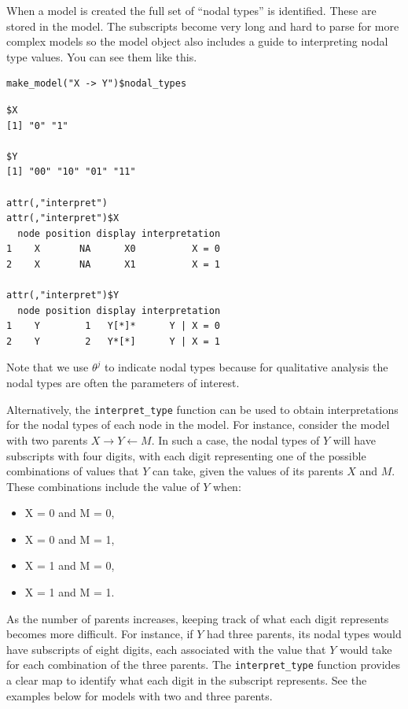 \documentclass[
  article]{jss}
\providecommand{\tightlist}{%
  \setlength{\itemsep}{0pt}\setlength{\parskip}{0pt}}\usepackage{longtable,booktabs,array}
\begin{document}
When a model is created the full set of ``nodal types'' is identified.
These are stored in the model. The subscripts become very long and hard
to parse for more complex models so the model object also includes a
guide to interpreting nodal type values. You can see them like this.

\begin{verbatim}
make_model("X -> Y")$nodal_types
\end{verbatim}

\begin{verbatim}
$X
[1] "0" "1"

$Y
[1] "00" "10" "01" "11"

attr(,"interpret")
attr(,"interpret")$X
  node position display interpretation
1    X       NA      X0          X = 0
2    X       NA      X1          X = 1

attr(,"interpret")$Y
  node position display interpretation
1    Y        1   Y[*]*      Y | X = 0
2    Y        2   Y*[*]      Y | X = 1
\end{verbatim}

Note that we use \(\theta^j\) to indicate nodal types because for
qualitative analysis the nodal types are often the parameters of
interest.

Alternatively, the \texttt{interpret\_type} function can be used to
obtain interpretations for the nodal types of each node in the model.
For instance, consider the model with two parents
\(X \rightarrow Y \leftarrow M.\) In such a case, the nodal types of
\(Y\) will have subscripts with four digits, with each digit
representing one of the possible combinations of values that \(Y\) can
take, given the values of its parents \(X\) and \(M.\) These
combinations include the value of \(Y\) when:

\begin{itemize}
\tightlist
\item
  X = 0 and M = 0,
\item
  X = 0 and M = 1,
\item
  X = 1 and M = 0,
\item
  X = 1 and M = 1.
\end{itemize}

As the number of parents increases, keeping track of what each digit
represents becomes more difficult. For instance, if \(Y\) had three
parents, its nodal types would have subscripts of eight digits, each
associated with the value that \(Y\) would take for each combination of
the three parents. The \texttt{interpret\_type} function provides a
clear map to identify what each digit in the subscript represents. See
the examples below for models with two and three parents.
\end{document}
